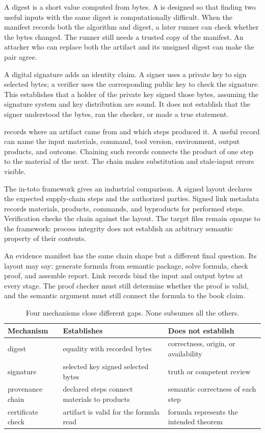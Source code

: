 A digest is a short value computed from bytes. A 
is designed so that finding two useful inputs with the same digest is
computationally difficult. When the manifest records both the algorithm and
digest, a later runner can check whether the bytes changed. The runner still
needs a trusted copy of the manifest. An attacker who can replace both the
artifact and its unsigned digest can make the pair agree.

A digital signature adds an identity claim. A signer uses a private key to
sign selected bytes; a verifier uses the corresponding public key to check the
signature. This establishes that a holder of the private key signed those
bytes, assuming the signature system and key distribution are sound. It does
not establish that the signer understood the bytes, ran the checker, or made a
true statement.

 records where an artifact came from and which steps
produced it. A useful record can name the input materials, command, tool
version, environment, output products, and outcome. Chaining such records
connects the product of one step to the material of the next. The chain makes
substitution and stale-input errors visible.

The in-toto framework gives an industrial comparison. A signed layout declares
the expected supply-chain steps and the authorized parties. Signed link
metadata records materials, products, commands, and byproducts for performed
steps. Verification checks the chain against the layout. The target files
remain opaque to the framework: process integrity does not establish an
arbitrary semantic property of their contents.\autocite{torresarias2019intoto}

An evidence manifest has the same chain shape but a different final question.
Its layout may say: generate formula from semantic package, solve formula,
check proof, and assemble report. Link records bind the input and output bytes
at every stage. The proof checker must still determine whether the proof is
valid, and the semantic argument must still connect the formula to the book
claim.

\begin{table}[htbp]
\centering
\caption{Four mechanisms close different gaps. None subsumes all the others.}
\begin{tabular}{@{}p{}p{}p{}@{}}
\toprule
Mechanism & Establishes & Does not establish \\
\midrule
digest & equality with recorded bytes & correctness, origin, or availability \\
signature & selected key signed selected bytes & truth or competent review \\
provenance chain & declared steps connect materials to products & semantic correctness of each step \\
certificate check & artifact is valid for the formula read & formula represents the intended theorem \\
\bottomrule
\end{tabular}
\label{tab:identity-provenance-truth}
\end{table}

